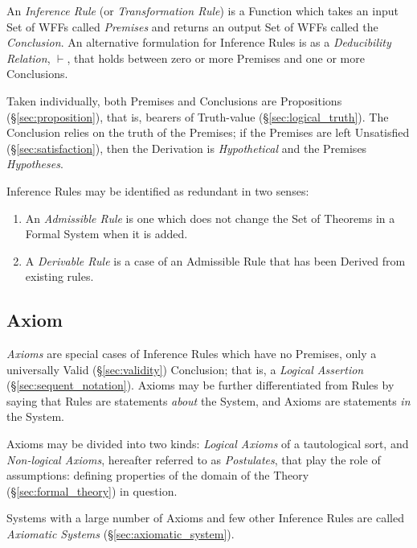An \emph{Inference Rule} (or \emph{Transformation Rule}) is a Function
which takes an input Set of WFFs called \emph{Premises} and returns an
output Set of WFFs called the \emph{Conclusion}. An alternative
formulation for Inference Rules is as a \emph{Deducibility Relation},
$\vdash$, that holds between zero or more Premises and one or more
Conclusions.

Taken individually, both Premises and Conclusions are Propositions
(\S\ref{sec:proposition}), that is, bearers of Truth-value
(\S\ref{sec:logical_truth}). The Conclusion relies on the truth of the
Premises; if the Premises are left Unsatisfied
(\S\ref{sec:satisfaction}), then the Derivation is \emph{Hypothetical}
and the Premises \emph{Hypotheses}.

Inference Rules may be identified as redundant in two senses:
\begin{enumerate}
\item An \emph{Admissible Rule} is one which does not change the Set
  of Theorems in a Formal System when it is added.
\item A \emph{Derivable Rule} is a case of an Admissible Rule that has
  been Derived from existing rules.
\end{enumerate}



\subsection{Axiom}\label{sec:axiom}

\emph{Axioms} are special cases of Inference Rules which have no
Premises, only a universally Valid (\S\ref{sec:validity}) Conclusion;
that is, a \emph{Logical Assertion} (\S\ref{sec:sequent_notation}).
Axioms may be further differentiated from Rules by saying that Rules
are statements \emph{about} the System, and Axioms are statements
\emph{in} the System.

Axioms may be divided into two kinds: \emph{Logical Axioms} of a
tautological sort, and \emph{Non-logical Axioms}, hereafter referred
to as \emph{Postulates}, that play the role of assumptions: defining
properties of the domain of the Theory (\S\ref{sec:formal_theory}) in
question.

Systems with a large number of Axioms and few other Inference Rules
are called \emph{Axiomatic Systems} (\S\ref{sec:axiomatic_system}).



